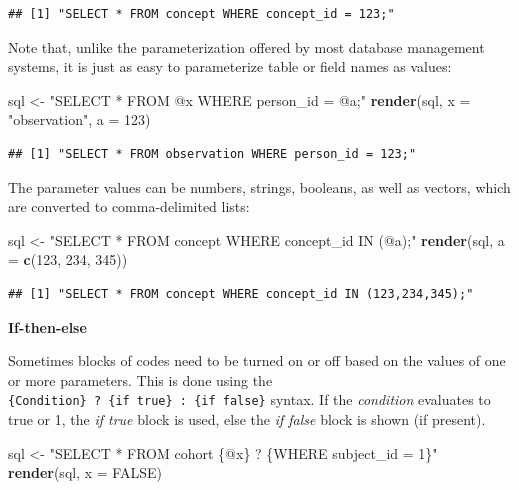 \documentclass[11pt]{book}
\newenvironment{Shaded}{\begin{snugshade}}{\end{snugshade}}
\newcommand{\DataTypeTok}[1]{\textcolor[rgb]{0.13,0.29,0.53}{#1}}
\newcommand{\DecValTok}[1]{\textcolor[rgb]{0.00,0.00,0.81}{#1}}
\newcommand{\KeywordTok}[1]{\textcolor[rgb]{0.13,0.29,0.53}{\textbf{#1}}}
\newcommand{\NormalTok}[1]{#1}
\newcommand{\OtherTok}[1]{\textcolor[rgb]{0.56,0.35,0.01}{#1}}
\newcommand{\StringTok}[1]{\textcolor[rgb]{0.31,0.60,0.02}{#1}}
\theoremstyle{definition}
\theoremstyle{definition}
\theoremstyle{definition}
\theoremstyle{remark}
\begin{document}
\begin{verbatim}
## [1] "SELECT * FROM concept WHERE concept_id = 123;"
\end{verbatim}

Note that, unlike the parameterization offered by most database management systems, it is just as easy to parameterize table or field names as values:

\begin{Shaded}
\begin{Highlighting}[]
\NormalTok{sql <-}\StringTok{ "SELECT * FROM @x WHERE person_id = @a;"}
\KeywordTok{render}\NormalTok{(sql, }\DataTypeTok{x =} \StringTok{"observation"}\NormalTok{, }\DataTypeTok{a =} \DecValTok{123}\NormalTok{)}
\end{Highlighting}
\end{Shaded}

\begin{verbatim}
## [1] "SELECT * FROM observation WHERE person_id = 123;"
\end{verbatim}

The parameter values can be numbers, strings, booleans, as well as vectors, which are converted to comma-delimited lists:

\begin{Shaded}
\begin{Highlighting}[]
\NormalTok{sql <-}\StringTok{ "SELECT * FROM concept WHERE concept_id IN (@a);"}
\KeywordTok{render}\NormalTok{(sql, }\DataTypeTok{a =} \KeywordTok{c}\NormalTok{(}\DecValTok{123}\NormalTok{, }\DecValTok{234}\NormalTok{, }\DecValTok{345}\NormalTok{))}
\end{Highlighting}
\end{Shaded}

\begin{verbatim}
## [1] "SELECT * FROM concept WHERE concept_id IN (123,234,345);"
\end{verbatim}

\textbf{If-then-else}

Sometimes blocks of codes need to be turned on or off based on the values of one or more parameters. This is done using the \texttt{\{Condition\}\ ?\ \{if\ true\}\ :\ \{if\ false\}} syntax. If the \emph{condition} evaluates to true or 1, the \emph{if true} block is used, else the \emph{if false} block is shown (if present).

\begin{Shaded}
\begin{Highlighting}[]
\NormalTok{sql <-}\StringTok{ "SELECT * FROM cohort \{@x\} ? \{WHERE subject_id = 1\}"}
\KeywordTok{render}\NormalTok{(sql, }\DataTypeTok{x =} \OtherTok{FALSE}\NormalTok{)}
\end{Highlighting}
\end{Shaded}
\end{document}
